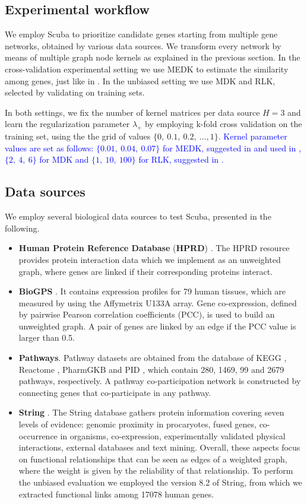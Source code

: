 \documentclass[twocolumn]{bmcart}%
\begin{document}
\subsection*{Experimental workflow}
We employ Scuba to prioritize candidate genes starting from multiple gene networks, obtained by various data sources. We transform every network by means of multiple graph node kernels as explained in the previous section. In the cross-validation experimental setting we use MEDK to estimate the similarity among genes, just like in \cite{f3pc}. In the unbiased setting we use MDK and RLK, selected by validating on training sets.

In both settings, we fix the number of kernel matrices per data source $H=3$ and learn the regularization parameter $\lambda_{+}$ by employing k-fold cross validation on the training set, using the the grid of values $\lbrace 0, \ 0.1,\ 0.2,\ \ldots, 1 \rbrace$. \textcolor{blue}{Kernel parameter values are set as follows: $\lbrace 0.01,\ 0.04,\ 0.07 \rbrace$ for MEDK, suggested in \cite{dir} and used in \cite{mrf}, $\lbrace 2,\ 4,\ 6 \rbrace$ for MDK and $\lbrace 1,\ 10,\ 100 \rbrace$ for RLK, suggested in \cite{mdk}.}

\subsection*{Data sources}
We employ several biological data sources to test Scuba, presented in the following.
\begin{itemize}
	\item \textbf{Human Protein Reference Database} (\textbf{HPRD}) \cite{hprd}. The HPRD resource provides protein interaction data which we implement as an unweighted graph, where genes are linked if their corresponding proteins interact.
	\item \textbf{BioGPS} \cite{biogps}. It contains expression profiles for 79 human tissues, which are measured by using the Affymetrix U133A array. Gene co-expression, defined by pairwise Pearson correlation coefficients (PCC), is used to build an unweighted graph. A pair of genes are linked by an edge if the PCC value is larger than 0.5.
	\item \textbf{Pathways}. Pathway datasets are obtained from the database of KEGG \cite{kegg}, Reactome \cite{reactome}, PharmGKB \cite{pharmgkb} and PID \cite{pid}, which contain 280, 1469, 99 and 2679 pathways, respectively. A pathway co-participation network is constructed by connecting genes that co-participate in any pathway.
	\item \textbf{String} \cite{string}. The String database gathers protein information covering seven levels of evidence: genomic proximity in procaryotes, fused genes, co-occurrence in organisms, co-expression, experimentally validated physical interactions, external databases and text mining. Overall, these aspects focus on functional relationships that can be seen as edges of a weighted graph, where the weight is given by the reliability of that relationship. To perform the unbiased evaluation we employed the version 8.2 of String, from which we extracted functional links among 17078 human genes.
\end{itemize}
\end{document}
